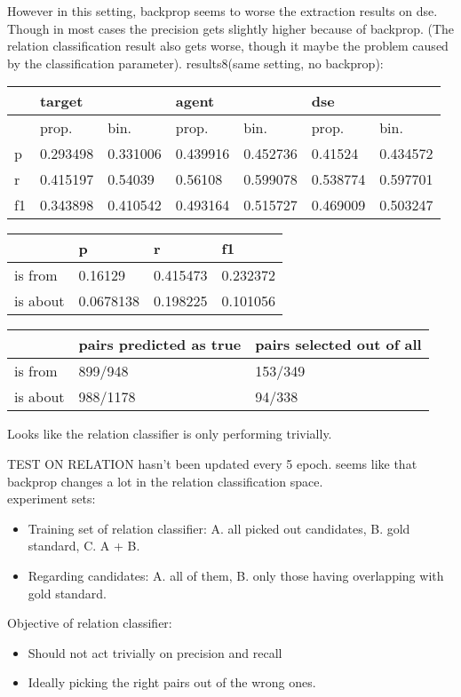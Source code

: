 \documentclass[a4paper, 12pt]{article}
\begin{document}
However in this setting, backprop seems to worse the extraction
results on dse. Though in most cases the precision gets slightly higher
because of backprop. (The relation classification result also gets worse, though it
maybe the problem caused by the classification parameter).
results8(same setting, no backprop):\\
\begin{table}[h!]
\centering
\begin{tabular}{l|ll|ll|ll}
\hline
   & \multicolumn{2}{l}{target} & \multicolumn{2}{l}{agent} & \multicolumn{2}{l}{dse} \\ \hline
   & prop.& bin.& prop.& bin.& prop.& bin.\\
 \hline
p  &0.293498&0.331006& 0.439916 & 0.452736 & 0.41524  & 0.434572  \\
r  &0.415197& 0.54039&  0.56108 & 0.599078 &0.538774  & 0.597701  \\
f1 &0.343898&0.410542& 0.493164 & 0.515727 &0.469009  & 0.503247  \\ \hline
\end{tabular}
\centering
\begin{tabular}{l|l|l|l}
\hline
         & p & r & f1    \\\hline
is from  & 0.16129& 0.415473& 0.232372 \\
is about &0.0678138&  0.198225&  0.101056\\
\hline
\end{tabular}
\begin{tabular}{l|l|l}
\hline
         & pairs predicted as true & pairs selected out of all\\\hline
is from  & 899/948& 153/349 \\
is about & 988/1178& 94/338\\
\hline
\end{tabular}
\end{table}

Looks like the relation classifier is only performing trivially.

TEST ON RELATION hasn't been updated every 5 epoch. 
seems like that backprop changes a lot in the relation classification
space.\\

experiment sets:\\
\begin{itemize}
  \item Training set of relation classifier: A. all picked out candidates,
    B. gold standard, C. A + B.
   \item Regarding candidates: A. all of them, B. only those having
     overlapping with gold standard.
\end{itemize}
Objective of relation classifier:\\
\begin{itemize}
  \item Should not act trivially on precision and recall
  \item Ideally picking the right pairs out of the wrong ones.
\end{itemize}
\end{document}
